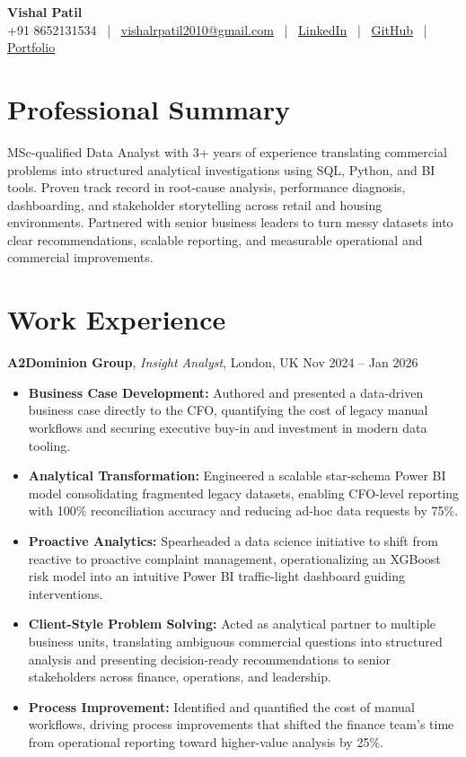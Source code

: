 \documentclass[10pt, a4paper]{article}
\begin{document}
\begin{center}
    {\LARGE \textbf{Vishal Patil}} \\[2pt]
    +91 8652131534 \, | \, \href{mailto:vishalrpatil2010@gmail.com}{vishalrpatil2010@gmail.com} \, | \, \href{https://www.linkedin.com/in/vishalrpatill/}{LinkedIn} \, | \, \href{https://github.com/VishalP44}{GitHub} \, | \, \href{https://vishalp44.github.io/Vishal\_Patil\_Portfolio/\#contact}{Portfolio}
\end{center}

\section*{Professional Summary}
MSc-qualified Data Analyst with 3+ years of experience translating commercial problems into structured analytical investigations using SQL, Python, and BI tools. Proven track record in root-cause analysis, performance diagnosis, dashboarding, and stakeholder storytelling across retail and housing environments. Partnered with senior business leaders to turn messy datasets into clear recommendations, scalable reporting, and measurable operational and commercial improvements.

\section*{Work Experience}

\textbf{A2Dominion Group}, \textit{Insight Analyst}, London, UK \hfill Nov 2024 -- Jan 2026
\begin{itemize}
    \item \textbf{Business Case Development:} Authored and presented a data-driven business case directly to the CFO, quantifying the cost of legacy manual workflows and securing executive buy-in and investment in modern data tooling.
    \item \textbf{Analytical Transformation:} Engineered a scalable star-schema Power BI model consolidating fragmented legacy datasets, enabling CFO-level reporting with 100\% reconciliation accuracy and reducing ad-hoc data requests by 75\%.
    \item \textbf{Proactive Analytics:} Spearheaded a data science initiative to shift from reactive to proactive complaint management, operationalizing an XGBoost risk model into an intuitive Power BI traffic-light dashboard guiding interventions.
    \item \textbf{Client-Style Problem Solving:} Acted as analytical partner to multiple business units, translating ambiguous commercial questions into structured analysis and presenting decision-ready recommendations to senior stakeholders across finance, operations, and leadership.
    \item \textbf{Process Improvement:} Identified and quantified the cost of manual workflows, driving process improvements that shifted the finance team's time from operational reporting toward higher-value analysis by 25\%.
\end{itemize}
\end{document}
